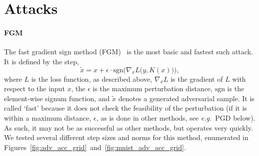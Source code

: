 \documentclass[lettersize,journal]{IEEEtran}
\newcommand{\eg}{\textit{e.g.}\xspace}
\newcommand{\erik}[1]{\textit{[{\color{brown}Erik: #1}]}}
\begin{document}
\section{Attacks}
\label{attacks}





\paragraph{FGM}

The fast gradient sign method (FGM)~\cite{fgm} is the most basic and fastest such attack. It is defined by the step,
$$
   \widetilde{x} = x + \epsilon \cdot \textrm{sgn}\Big(\nabla_{x} L\big(y, K(x)\big)\Big),
$$
where $L$ is the loss function, as described above, $\nabla_{x} L$ is the gradient of $L$ with respect to the input $x$, the $\epsilon$ is the maximum perturbation distance, $\textrm{sgn}$ is the element-wise signum function, and $\widetilde{x}$ denotes a generated adversarial sample. It is called `fast' because it does not check the feasibility of the perturbation (if it is within a maximum distance, $\epsilon$, as is done in other methods, see \eg~PGD below).
%
%
As such, it may not be as successful as other methods, but operates very quickly. We tested several different step sizes and norms for this method, enumerated in Figures~\ref{fig:adv_acc_grid}~and~\ref{fig:mnist_adv_acc_grid}. 
\end{document}
